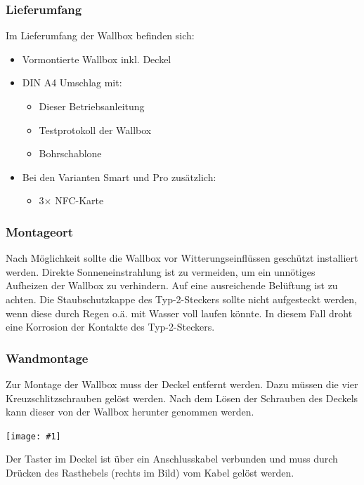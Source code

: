 \documentclass[a4paper,10pt]{article}
\newcommand{\hint}[1]{\begin{tcolorbox}[colback=boxgray,colframe=black,coltext=
white,title=Hinweis,left*=2mm,right*=2mm,boxsep=1mm,bottom=1mm,top=1mm]#1\end{tcolorbox}}
\newcommand{\gfx}[1]{\texttt{[image: \#1]}}
\begin{document}
\begin{multicols*}{2}
    \subsubsection{Lieferumfang}
    Im Lieferumfang der Wallbox befinden sich:
    \begin{itemize}
        \item Vormontierte Wallbox inkl. Deckel
        \item DIN A4 Umschlag mit:
        \begin{itemize}
            \item Dieser Betriebsanleitung
            \item Testprotokoll der Wallbox
            \item Bohrschablone
        \end{itemize}
		\item Bei den Varianten Smart und Pro zusätzlich:
        \begin{itemize}
        	\item 3$\times$ NFC-Karte
        \end{itemize}
    \end{itemize}

    \subsubsection{Montageort}
    Nach Möglichkeit sollte die Wallbox vor Witterungseinflüssen geschützt
    installiert werden. Direkte Sonneneinstrahlung ist zu vermeiden, um ein
    unnötiges Aufheizen der Wallbox zu verhindern. Auf eine ausreichende Belüftung
    ist zu achten. Die Staubschutzkappe des Typ-2-Steckers sollte nicht aufgesteckt
    werden, wenn diese durch Regen o.ä. mit Wasser voll laufen könnte. In diesem Fall
    droht eine Korrosion der Kontakte des Typ-2-Steckers.

    \subsubsection{Wandmontage}\label{wandmontage}
    Zur Montage der Wallbox muss der Deckel entfernt werden. Dazu müssen die
    vier Kreuzschlitzschrauben gelöst werden.
    Nach dem Lösen der Schrauben des Deckels kann dieser von der Wallbox herunter genommen
    werden.

    \gfx{./img_warp3/resized/warp_screw_points_ready}


    \hint{Der Taster im Deckel ist über ein Anschlusskabel verbunden und muss
        durch Drücken des Rasthebels (rechts im Bild) vom Kabel gelöst werden.}


\end{multicols*}
\end{document}
